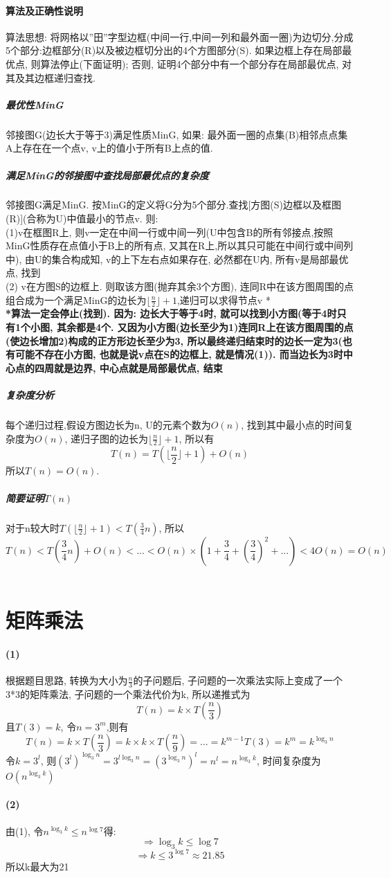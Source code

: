 \documentclass[a4paper,10pt]{article}
\begin{document}
  \paragraph{算法及正确性说明} 算法思想: 将网格以''田''字型边框(中间一行,中间一列和最外面一圈)为边切分,分成5个部分:边框部分(R)以及被边框切分出的4个方图部分(S). 如果边框上存在局部最优点, 则算法停止(下面证明); 否则, 证明4个部分中有一个部分存在局部最优点, 对其及其边框递归查找.
  \subparagraph{最优性MinG}邻接图G(边长大于等于3)满足性质MinG, 如果: 最外面一圈的点集(B)相邻点点集A上存在在一个点v, v上的值小于所有B上点的值.
  \subparagraph{满足MinG的邻接图中查找局部最优点的复杂度}邻接图G满足MinG. 按MinG的定义将G分为5个部分.查找[方图(S)边框以及框图(R)](合称为U)中值最小的节点v. 则:\\ 
  (1)v在框图R上, 则v一定在中间一行或中间一列(U中包含B的所有邻接点,按照MinG性质存在点值小于B上的所有点, 又其在R上,所以其只可能在中间行或中间列中), 由U的集合构成知, v的上下左右点如果存在, 必然都在U内, 所有v是局部最优点, 找到 \\
  (2) v在方图S的边框上. 则取该方图(抛弃其余3个方图), 连同R中在该方图周围的点组合成为一个满足MinG的边长为$\lfloor\frac{n}{2}\rfloor+1$,递归可以求得节点v *\\
  \textbf{*算法一定会停止(找到). 因为: 边长大于等于4时, 就可以找到小方图(等于4时只有1个小图, 其余都是4个. 又因为小方图(边长至少为1)连同R上在该方图周围的点(使边长增加2)构成的正方形边长至少为3, 所以最终递归结束时的边长一定为3(也有可能不存在小方图, 也就是说v点在S的边框上, 就是情况(1)). 而当边长为3时中心点的四周就是边界, 中心点就是局部最优点, 结束} 
  \subparagraph{复杂度分析} 每个递归过程,假设方图边长为n, U的元素个数为$O(n)$, 找到其中最小点的时间复杂度为$O(n)$, 递归子图的边长为$\lfloor\frac{n}{2}\rfloor+1$, 所以有 
  $$T(n)=T(\lfloor\frac{n}{2}\rfloor+1)+O(n)$$
  所以$T(n)=O(n)$.
  \subparagraph{简要证明$T(n)$}
  对于n较大时$T(\lfloor\frac{n}{2}\rfloor+1) < T(\frac{3}{4}n)$, 所以
  $$T(n)<T(\frac{3}{4}n)+O(n)<...<O(n)\times(1+ \frac{3}{4} + (\frac{3}{4})^2+...)<4O(n)=O(n)$$\\
  
   
\section{矩阵乘法}
  \paragraph{(1)} 根据题目思路, 转换为大小为$\frac{n}{3}$的子问题后, 子问题的一次乘法实际上变成了一个3*3的矩阵乘法, 子问题的一个乘法代价为k, 所以递推式为
  $$T(n)=k\times T(\frac{n}{3})$$
  且$T(3)=k$, 令$n= 3^m$,则有 
  $$T(n)=k\times T(\frac{n}{3})=k\times k\times T(\frac{n}{9})=...=k^{m-1}T(3)=k^m=k^{\log_3 n}$$
  令$k=3^l$, 则$(3^l)^{\log_3 n}=3^{l\log_3 n}=(3^{\log_3 n})^l=n^l=n^{\log_3 k}$, 时间复杂度为$O(n^{\log_3 k})$
  \paragraph{(2)} 由(1), 令$n^{\log_3 k}\leq n^{\log 7}$得:
  $$ \Rightarrow \log_3 k \leq \log 7 $$ 
  $$\Rightarrow k \leq 3^{\log 7} \approx 21.85$$
  所以k最大为21
\end{document}
